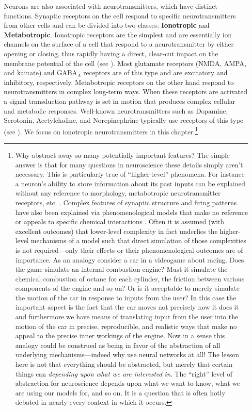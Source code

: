 Neurons are also associated with neurotransmitters, which have distinct functions. Synaptic receptors on the cell respond to specific neurotransmitters from other cells and can be divided into two classes: \textbf{Ionotropic} and \textbf{Metabotropic}. Ionotropic receptors are the simplest and are essentially ion channels on the surface of a cell that respond to a neurotransmitter by either opening or closing, thus rapidly having a direct, clear-cut impact on the membrane potential of the cell (see ). Most glutamate receptors (NMDA, AMPA, and kainate) and GABA$_A$ receptors are of this type and are excitatory and inhibitory, respectively. Metabotropic receptors on the other hand respond to neurotransmitters in complex long-term ways. When these receptors are activated a signal transduction pathway is set in motion that produces complex cellular and metabolic responses. Well-known neurotransmitters  such as Dopamine, Serotonin, Acetylcholine, and Norepinephrine typically use receptors of this type (see ). We focus on ionotropic neurotransmitters in this chapter.\footnote{Why abstract away so many potentially important features? The simple answer is that for many questions in neuroscience these details simply aren't necessary. This is particularly true of ``higher-level'' phenomena. For instance a neuron's ability to store information about its past inputs can be explained without any reference to morphology, metabotropic neurotransmitter receptors, etc. \cite{maass2002computing}. Complex features of synaptic structure and firing patterns have also been explained via phenomenological models that make no reference or appeals to specific chemical interactions \cite{lazar2009sorn, miner2016plasticity}. Often it is assumed (with excellent outcomes) that lower-level complexity in fact underlies the higher-level mechanisms of a model such that direct simulation of those complexities is not required---only their effects or their phenomenological outcomes are of importance. As an analogy consider a car in a videogame about racing. Does the game simulate an internal combustion engine? Must it simulate the chemical combustion of octane for each cylinder, the friction between various components of the engine and so on? Or is it acceptable to merely simulate the motion of the car in response to inputs from the user? In this case the important aspect is the fact that the car moves not precisely how it does it and furthermore we have means of translating input from the user into the motion of the car in precise, reproducible, and realistic ways that make no appeal to the precise inner workings of the engine. Now in a sense this analogy could be construed  as being in favor of the abstraction of all underlying mechanisms---indeed why use neural networks at all! The lesson here is not that everything should be abstracted, but merely that certain things can \emph{depending upon what we are interested in}. The ``right'' level of abstraction for neuroscience depends upon what we want to know, what we are using our models for, and so on. It is a question that is often hotly debated in nearly every context in which it occurs.}

